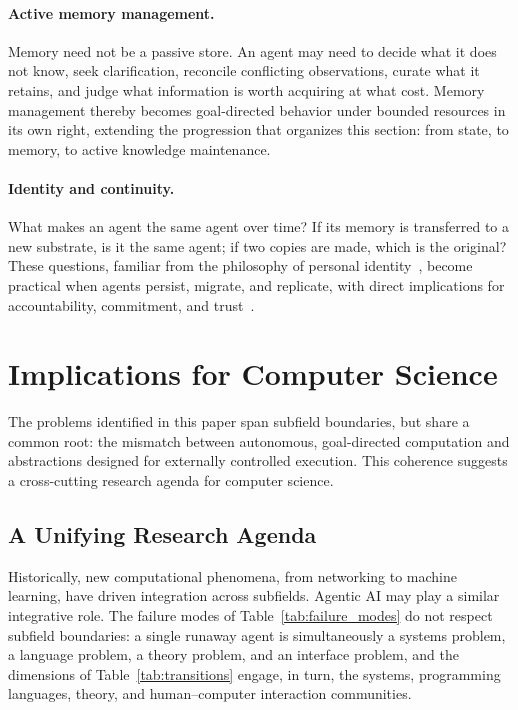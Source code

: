 \documentclass[11pt]{article}
\begin{document}
\paragraph{Active memory management.} Memory need not be a passive store. An agent may need to decide what it does not know, seek clarification, reconcile conflicting observations, curate what it retains, and judge what information is worth acquiring at what cost. Memory management thereby becomes goal-directed behavior under bounded resources in its own right, extending the progression that organizes this section: from state, to memory, to active knowledge maintenance.

\paragraph{Identity and continuity.} What makes an agent the same agent over time? If its memory is transferred to a new substrate, is it the same agent; if two copies are made, which is the original? These questions, familiar from the philosophy of personal identity~\cite{parfit_reasons}, become practical when agents persist, migrate, and replicate, with direct implications for accountability, commitment, and trust~\cite{chan_ids}.



\section{Implications for Computer Science}
\label{sec:implications}

The problems identified in this paper span subfield boundaries, but share a common root: the mismatch between autonomous, goal-directed computation and abstractions designed for externally controlled execution. This coherence suggests a cross-cutting research agenda for computer science.

\subsection{A Unifying Research Agenda}

Historically, new computational phenomena, from networking to machine learning, have driven integration across subfields. Agentic AI may play a similar integrative role. The failure modes of Table~\ref{tab:failure_modes} do not respect subfield boundaries: a single runaway agent is simultaneously a systems problem, a language problem, a theory problem, and an interface problem, and the dimensions of Table~\ref{tab:transitions} engage, in turn, the systems, programming languages, theory, and human--computer interaction communities.
\end{document}
